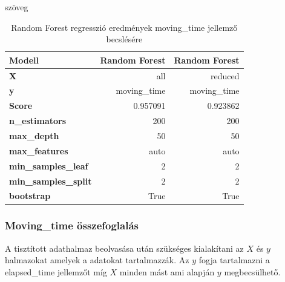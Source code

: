 szöveg
\begin{table}[!h]
	\centering
	\begin{tabular}{|l|r|r|}
		\hline
		\textbf{Modell}              & \multicolumn{1}{l|}{\textbf{Random Forest}} & \multicolumn{1}{l|}{\textbf{Random Forest}} \\ \hline
		\textbf{X}                   & all                                         & reduced                                     \\ \hline
		\textbf{y}                   & moving\_time                                & moving\_time                                \\ \hline
		\textbf{Score}               & 0.957091                                    & 0.923862                                    \\ \hline
		\textbf{n\_estimators}       & 200                                         & 200                                         \\ \hline
		\textbf{max\_depth}          & 50                                          & 50                                          \\ \hline
		\textbf{max\_features}       & auto                                        & auto                                        \\ \hline
		\textbf{min\_samples\_leaf}  & 2                                           & 2                                           \\ \hline
		\textbf{min\_samples\_split} & 2                                           & 2                                           \\ \hline
		\textbf{bootstrap}           & True                                        & True                                        \\ \hline
	\end{tabular}
\caption{Random Forest regresszió eredmények moving\_time jellemző becslésére}
\end{table}



\subsubsection{Moving\_time összefoglalás}




A tisztított adathalmaz beolvasása után szükséges kialakítani az $X$ és $y$ halmazokat amelyek a \TODO adatokat tartalmazzák. Az $y$ fogja tartalmazni a elapsed\_time jellemzőt míg $X$ minden mást ami alapján $y$ megbecsülhető. 

